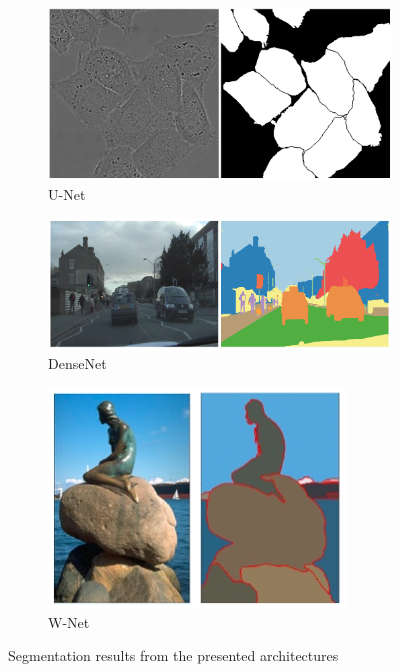 \begin{figure}
    \newcommand{\SegmentationExampleImageWidth}{0.3\textwidth}
    \centering
    \hfill
    \begin{subfigure}{\SegmentationExampleImageWidth}
        \includegraphics[width=\textwidth]{images/segmentation_example_unet}
        \caption{U-Net~\cite{unet15}}
        \label{fig:exseg_unet}
    \end{subfigure}
    \hfill
    \begin{subfigure}{0.4\textwidth}
        \includegraphics[width=\textwidth]{images/segmentation_example_densenet}
        \caption{DenseNet~\cite{denseseg17}}
        \label{fig:exseg_densenet}
    \end{subfigure}
    \hfill
    \begin{subfigure}{0.21\textwidth}
        \includegraphics[width=\textwidth]{images/segmentation_example_wnet}
        \caption{W-Net~\cite{wnet17}}
        \label{fig:exseg_wnet}
    \end{subfigure}
    \hfill
    \caption{Segmentation results from the presented architectures}
    \label{fig:segmentation_examples}
\end{figure}


\newpage